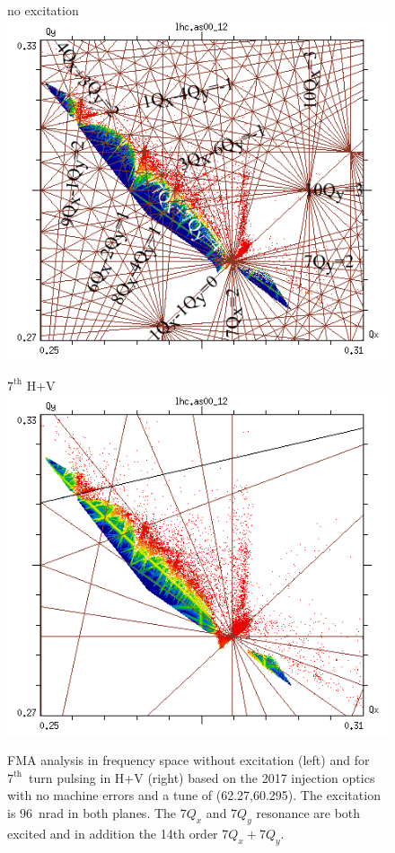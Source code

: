 \documentclass[%
 reprint,
 amsmath,amssymb,
 aps,
prstab,
]{revtex4-1}
\begin{document}
\begin{figure}[h]
	\begin{minipage}[t]{0.49\linewidth}
		\centering
		no excitation
		\includegraphics[width=1.0\linewidth]{2017injnocolc15o+19_6noerru_dp0_ord14_annotate.png}
	\end{minipage}
	\begin{minipage}[t]{0.49\linewidth}
		\centering
		$7^{\mathrm{th}}$ H+V
		\includegraphics[width=1.0\linewidth]{2017injnocolc15o+19_6noerrut7skhv_dp0_ord7.png}
	\end{minipage}	
	\caption{\label{fig:7th2017fma} FMA analysis in frequency space without excitation (left) and for $7^{\mathrm{th}}$~turn pulsing in H+V (right) based on the 2017 injection optics with no machine errors and a tune of (62.27,60.295). The excitation is 96~nrad in both planes. The $7Q_x$ and $7Q_y$ resonance are both excited and in addition the 14th order $7Q_x+7Q_y$.}
\end{figure}
\end{document}
